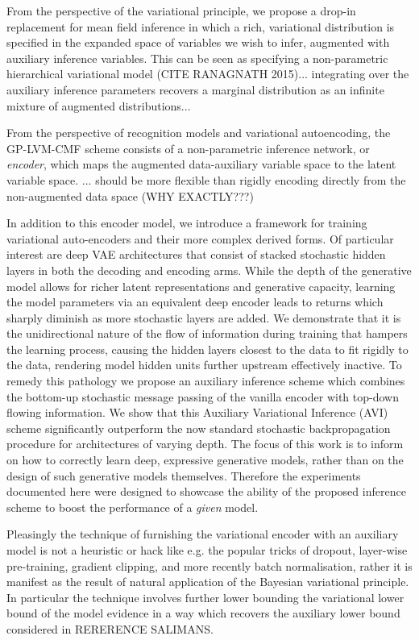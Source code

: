 \documentclass[]{article}
\begin{document}
From the perspective of the variational principle, we propose a drop-in replacement for mean field inference in which a rich, variational distribution is specified in the expanded space of variables we wish to infer, augmented with auxiliary inference variables.
This can be seen as specifying a non-parametric hierarchical variational model (CITE RANAGNATH 2015)... integrating over the auxiliary inference parameters recovers a marginal distribution as an infinite mixture of augmented distributions...

From the perspective of recognition models and variational autoencoding, the GP-LVM-CMF scheme consists of a non-parametric inference network, or \emph{encoder}, which maps the augmented data-auxiliary variable space to the latent variable space. ... should be more flexible than rigidly encoding directly from the non-augmented data space (WHY EXACTLY???)

In addition to this encoder model, we introduce a framework for training variational auto-encoders and their more complex derived forms. Of particular interest are deep VAE architectures that consist of stacked stochastic hidden layers in both the decoding and encoding arms. While the depth of the generative model allows for richer latent representations and generative capacity, learning the model parameters via an equivalent deep encoder leads to returns which sharply diminish as more stochastic layers are added. We demonstrate that it is the unidirectional nature of the flow of information during training that hampers the learning process, causing the hidden layers closest to the data to fit rigidly to the data, rendering model hidden units further upstream effectively inactive. To remedy this pathology we propose an auxiliary inference scheme which combines the bottom-up stochastic message passing of the vanilla encoder with top-down flowing information. We show that this Auxiliary Variational Inference (AVI) scheme significantly outperform the now standard stochastic backpropagation procedure for architectures of varying depth.
The focus of this work is to inform on how to correctly learn deep, expressive generative models, rather than on the design of such generative models themselves. Therefore the experiments documented here were designed to showcase the ability of the proposed inference scheme to boost the performance of a \emph{given} model.

Pleasingly the technique of furnishing the variational encoder with an auxiliary model is not a heuristic or hack like e.g. the popular tricks of dropout, layer-wise pre-training, gradient clipping, and more recently batch normalisation, rather it is manifest as the result of natural application of the Bayesian variational principle. In particular the technique involves further lower bounding the variational lower bound of the model evidence in a way which recovers the auxiliary lower bound considered in RERERENCE SALIMANS.
\end{document}
